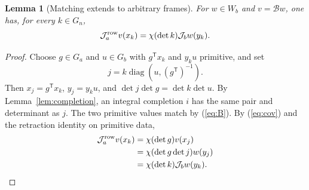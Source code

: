\documentclass[11pt]{article}
\newtheorem{lemma}[theorem]{Lemma}
\theoremstyle{remark}\newtheorem{remark}[theorem]{Remark}
\newcommand{\Orb}{\mathcal J}
\newcommand{\Match}{\mathcal B}
\begin{document}
\begin{lemma}[Matching extends to arbitrary frames]\label{lem:global}
For $w\in W_b$ and $v=\Match w$, one has, for every $k\in G_n$,
\begin{equation}\label{eq:global}
 \Orb_a^{\rm row} v(x_k)=\chi(\det k)\Orb_b w(y_k).
\end{equation}
\end{lemma}
\begin{proof}
Choose $g\in G_a$ and $u\in G_b$ with $g^{\mathsf T}x_k$ and $y_k u$ primitive, and set
\[
 j=k\operatorname{diag}(u,(g^{\mathsf T})^{-1}).
\]
Then $x_j=g^{\mathsf T}x_k$, $y_j=y_k u$, and $\det j\det g=\det k\det u$. By Lemma~\ref{lem:completion}, an integral completion $i$ has the same pair and determinant as $j$. The two primitive values match by (\ref{eq:B}). By (\ref{eq:cov}) and the retraction identity on primitive data,
\begin{align*}
 \Orb_a^{\rm row}v(x_k)&=\chi(\det g)v(x_j)\\
 &=\chi(\det g\det j)w(y_j)\\
 &=\chi(\det k)\Orb_b w(y_k).
\end{align*}
\end{proof}
\end{document}
